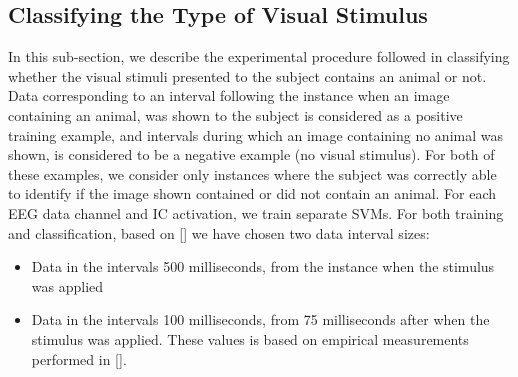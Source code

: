 \documentclass{article} %
\begin{document}
\subsection{Classifying the Type of Visual Stimulus}
In this sub-section, we describe the experimental procedure followed in classifying whether the visual stimuli presented to the subject contains an animal or not. Data corresponding to an interval following the instance when an image containing an animal, was shown to the subject is considered as a positive training example, and intervals during which an image containing no animal was shown, is considered to be a negative example (no visual stimulus). For both of these examples, we consider only instances where the subject was correctly able to identify if the image shown contained or did not contain an animal. For each EEG data channel and IC activation, we train separate SVMs. For both training and classification, based on [] we have chosen two data interval sizes:

\begin{itemize}
	\item Data in the intervals 500 milliseconds, from the instance when the stimulus was applied
	\item Data in the intervals 100 milliseconds, from 75 milliseconds after when the stimulus was applied. These values is based on empirical measurements performed in [].
\end{itemize}







%
%
%
%
\end{document}
